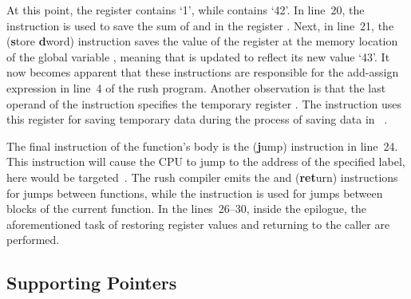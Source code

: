 At this point, the register  contains `1', while  contains `42'.
In line~20, the  instruction is used to save the sum of  and  in the register .
Next, in line~21, the  (\textbf{s}tore \textbf{d}word) instruction saves the value of the register  at the memory location of the global variable ,
meaning that  is updated to reflect its new value `43'.
It now becomes apparent that these instructions are responsible for the add-assign expression in line~4 of the rush program.
Another observation is that the last operand of the  instruction specifies the temporary register .
The instruction uses this register for saving temporary data during the process of saving data in ~\cite[Reference Card]{Patterson2017}.

The final instruction of the  function's body is the  (\textbf{j}ump) instruction in line~24.
This instruction will cause the CPU to jump to the address of the specified label,
here  would be targeted~\cite[p.~17]{Patterson2017}.
The rush compiler emits the  and  (\textbf{ret}urn) instructions for jumps between functions,
while the  instruction is used for jumps between blocks of the current function.
In the lines~26--30, inside the epilogue, the aforementioned task of restoring register values and returning to the caller are performed.

\subsection{Supporting Pointers}

\noindent
\begin{minipage}{.34\textwidth}
	\centering
\end{minipage}%
\hspace{3cm}
\begin{minipage}{.45\textwidth}
	\centering
	\vspace{.1cm}
\end{minipage}

